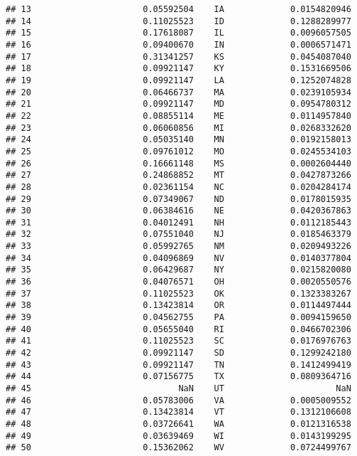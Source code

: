 \documentclass{article}\usepackage[]{graphicx}\usepackage[]{color}
\makeatletter
\newenvironment{kframe}{%
 \def\at@end@of@kframe{}%
 \ifinner\ifhmode%
  \def\at@end@of@kframe{\end{minipage}}%
  \begin{minipage}{\columnwidth}%
 \fi\fi%
 \def\FrameCommand##1{\hskip\@totalleftmargin \hskip-\fboxsep
 \colorbox{shadecolor}{##1}\hskip-\fboxsep
     \hskip-\linewidth \hskip-\@totalleftmargin \hskip\columnwidth}%
 \MakeFramed {\advance\hsize-\width
   \@totalleftmargin\z@ \linewidth\hsize
   \@setminipage}}%
 {\par\unskip\endMakeFramed%
 \at@end@of@kframe}
\newenvironment{knitrout}{}{} %
\makeatother
\begin{document}
\begin{knitrout}
\begin{kframe}
\begin{verbatim}
## 13                      0.05592504    IA             0.0154820946
## 14                      0.11025523    ID             0.1288289977
## 15                      0.17618087    IL             0.0096057505
## 16                      0.09400670    IN             0.0006571471
## 17                      0.31341257    KS             0.0454087040
## 18                      0.09921147    KY             0.1531669506
## 19                      0.09921147    LA             0.1252074828
## 20                      0.06466737    MA             0.0239105934
## 21                      0.09921147    MD             0.0954780312
## 22                      0.08855114    ME             0.0114957840
## 23                      0.06060856    MI             0.0268332620
## 24                      0.05035140    MN             0.0192158013
## 25                      0.09761012    MO             0.0245534103
## 26                      0.16661148    MS             0.0002604440
## 27                      0.24868852    MT             0.0427873266
## 28                      0.02361154    NC             0.0204284174
## 29                      0.07349067    ND             0.0178015935
## 30                      0.06384616    NE             0.0420367863
## 31                      0.04012491    NH             0.0112185443
## 32                      0.07551040    NJ             0.0185463379
## 33                      0.05992765    NM             0.0209493226
## 34                      0.04096869    NV             0.0140377804
## 35                      0.06429687    NY             0.0215820080
## 36                      0.04076571    OH             0.0020550576
## 37                      0.11025523    OK             0.1323383267
## 38                      0.13423814    OR             0.0114497444
## 39                      0.04562755    PA             0.0094159650
## 40                      0.05655040    RI             0.0466702306
## 41                      0.11025523    SC             0.0176976763
## 42                      0.09921147    SD             0.1299242180
## 43                      0.09921147    TN             0.1412499419
## 44                      0.07156775    TX             0.0809364716
## 45                             NaN    UT                      NaN
## 46                      0.05783006    VA             0.0005009552
## 47                      0.13423814    VT             0.1312106608
## 48                      0.03726641    WA             0.0121316538
## 49                      0.03639469    WI             0.0143199295
## 50                      0.15362062    WV             0.0724499767

\end{verbatim}
\end{kframe}
\end{knitrout}
\end{document}

